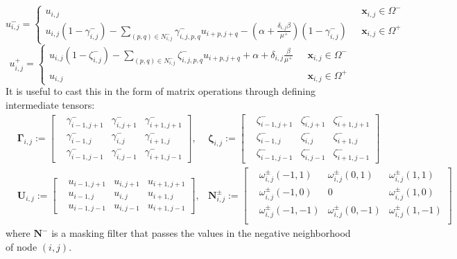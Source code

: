 \documentclass{elsarticle}
\begin{document}
\begin{equation}
 u_{i,j}^-=\begin{cases}
    u_{i,j}   & \text{ $\mathbf{x}_{i,j}\in \Omega^-$}\\
    u_{i,j} (1 - \gamma_{i,j}^- ) - \sum_{(p,q)\in N_{i,j}^-} \gamma_{i,j,p,q}^- u_{i+p,j+q} - (\alpha + \frac{\delta_{i,j}\beta}{\mu^+})(1-\gamma^-_{i,j}) & \text{ $\mathbf{x}_{i,j}\in \Omega^+$}
  \end{cases}
\end{equation}
\begin{equation}
 u_{i,j}^+=\begin{cases}
    u_{i,j}(1 - \zeta^-_{i,j} ) - \sum_{(p,q)\in N_{i,j}^-} \zeta^-_{i,j,p,q}u_{i+p,j+q}  + \alpha + \delta_{i,j}\frac{\beta}{\mu^+}& \text{ $\mathbf{x}_{i,j}\in \Omega^-$}\\
    u_{i,j} & \text{ $\mathbf{x}_{i,j}\in \Omega^+$}
  \end{cases}
\end{equation}
It is useful to cast this in the form of matrix operations through defining intermediate tensors:
\begin{align*}
&\boldsymbol{\Gamma}_{i,j} := \begin{bmatrix}
&\gamma_{i-1,j+1}^- & \gamma^-_{i,j+1} & \gamma^-_{i+1,j+1}\\
&\gamma_{i-1,j}^- & \gamma^-_{i,j} & \gamma^-_{i+1,j}\\
&\gamma_{i-1,j-1}^- & \gamma^-_{i,j-1} & \gamma^-_{i+1,j-1}
\end{bmatrix},            &\boldsymbol{\zeta}_{i,j} := \begin{bmatrix}
&\zeta^-_{i-1,j+1} & \zeta^-_{i,j+1} & \zeta^-_{i+1,j+1}\\
&\zeta^-_{i-1,j} & \zeta^-_{i,j} & \zeta^-_{i+1,j}\\
&\zeta^-_{i-1,j-1} & \zeta^-_{i,j-1} & \zeta^-_{i+1,j-1}
\end{bmatrix}  \\
&  \mathbf{U}_{i,j} := \begin{bmatrix}
& u_{i-1,j+1}   & u_{i,j+1}   & u_{i+1, j+1}\\
& u_{i-1,j}   & u_{i,j}   & u_{i+1, j}\\
& u_{i-1,j-1}   & u_{i,j-1}   & u_{i+1, j-1}
\end{bmatrix}, & \mathbf{N}^\pm_{i,j} :=\begin{bmatrix}
&\omega_{i,j}^\pm(-1,1)   &\omega_{i,j}^\pm(0,1)  &\omega_{i,j}^\pm(1,1) \\
&\omega_{i,j}^\pm(-1,0)   &0  &\omega_{i,j}^\pm(1,0) \\
&\omega_{i,j}^\pm(-1,-1)   &\omega_{i,j}^\pm(0,-1)  &\omega_{i,j}^\pm(1,-1) \\
\end{bmatrix}
\end{align*}
where $\mathbf{N^-}$ is a masking filter that passes the values in the negative neighborhood of node $(i,j)$.
\end{document}
